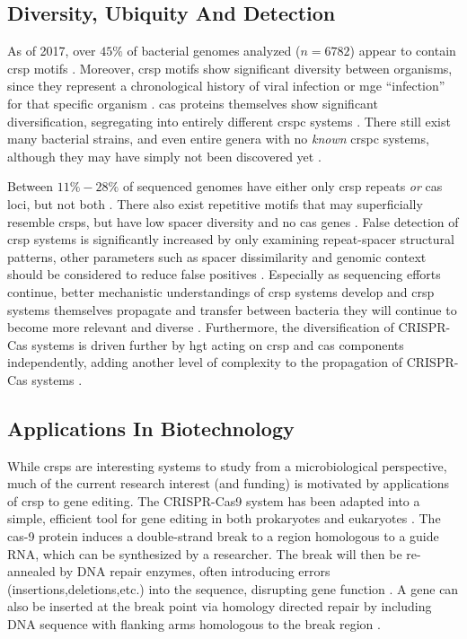 \subsection*{Diversity, Ubiquity And Detection}
As of 2017, over $45\%$ of bacterial genomes analyzed ($n=6782$) appear to contain \ac{crsp} motifs \citep{crispdb}.
Moreover, \ac{crsp} motifs show significant diversity between organisms, since they represent a chronological history of viral infection or \ac{mge} ``infection'' for that specific organism \citep{crispgen}.
\ac{cas} proteins themselves show significant diversification, segregating into entirely different \ac{crspc} systems \citep{evocas}.
There still exist many bacterial strains, and even entire genera with no \textit{known} \ac{crspc} systems, although they may have simply not been discovered yet \citep{ineqcas,casguild}.\par
Between $11\%-28\%$ of sequenced genomes have either only \ac{crsp} repeats \textit{or} \ac{cas} loci, but not both \citep{ineqcas}.
There also exist repetitive motifs that may superficially resemble \ac{crsp}s, but have low spacer diversity and no \ac{cas} genes \citep{ineqcas}.
False detection of \ac{crsp} systems is significantly increased by only examining repeat-spacer structural patterns, other parameters such as spacer dissimilarity and genomic context should be considered to reduce false positives \citep{ineqcas}.
Especially as sequencing efforts continue, better mechanistic understandings of \ac{crsp} systems develop and \ac{crsp} systems themselves propagate and transfer between bacteria they will continue to become more relevant and diverse \citep{crispgen}.
Furthermore, the diversification of CRISPR-Cas systems is driven further by \ac{hgt} acting on \ac{crsp} and \ac{cas} components independently, adding another level of complexity to the propagation of CRISPR-Cas systems \citep{crispgen}.
\subsection*{Applications In Biotechnology}
While \ac{crsp}s are interesting systems to study from a microbiological perspective, much of the current research interest (and funding) is motivated by applications of \ac{crsp} to gene editing.
The CRISPR-Cas9 system has been adapted into a simple, efficient tool for gene editing in both prokaryotes and eukaryotes \citep{crispgen}.
The \ac{cas}-9 protein induces a double-strand break to a region homologous to a guide RNA, which can be synthesized by a researcher.
The break will then be re-annealed by DNA repair enzymes, often introducing errors (insertions,deletions,etc.) into the sequence, disrupting gene function \citep{crispgen}.
A gene can also be inserted at the break point via homology directed repair by including DNA sequence with flanking arms homologous to the break region \citep{crispgen}.
